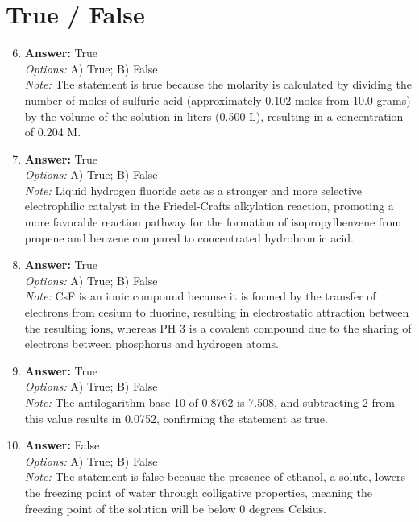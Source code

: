 \documentclass[12pt]{article}
\begin{document}
\section*{True / False}
\begin{enumerate}[label=\arabic*.]
\setcounter{enumi}{5}
\item \textbf{Answer:} True
\\ \textit{Options:} A) True; B) False
\\ \textit{Note:} The statement is true because the molarity is calculated by dividing the number of moles of sulfuric acid (approximately 0.102 moles from 10.0 grams) by the volume of the solution in liters (0.500 L), resulting in a concentration of 0.204 M.
\item \textbf{Answer:} True
\\ \textit{Options:} A) True; B) False
\\ \textit{Note:} Liquid hydrogen fluoride acts as a stronger and more selective electrophilic catalyst in the Friedel-Crafts alkylation reaction, promoting a more favorable reaction pathway for the formation of isopropylbenzene from propene and benzene compared to concentrated hydrobromic acid.
\item \textbf{Answer:} True
\\ \textit{Options:} A) True; B) False
\\ \textit{Note:} CsF is an ionic compound because it is formed by the transfer of electrons from cesium to fluorine, resulting in electrostatic attraction between the resulting ions, whereas PH 3 is a covalent compound due to the sharing of electrons between phosphorus and hydrogen atoms.
\item \textbf{Answer:} True
\\ \textit{Options:} A) True; B) False
\\ \textit{Note:} The antilogarithm base 10 of 0.8762 is 7.508, and subtracting 2 from this value results in 0.0752, confirming the statement as true.
\item \textbf{Answer:} False
\\ \textit{Options:} A) True; B) False
\\ \textit{Note:} The statement is false because the presence of ethanol, a solute, lowers the freezing point of water through colligative properties, meaning the freezing point of the solution will be below 0 degrees Celsius.
\end{enumerate}
\end{document}
